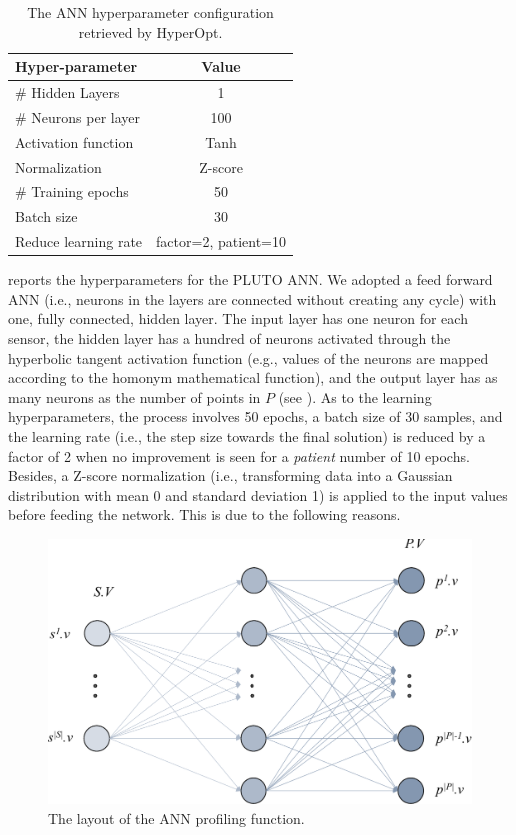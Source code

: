 \begin{table}[t]
\centering
\caption{The ANN hyperparameter configuration retrieved by HyperOpt.}
\begin{tabular}{lc}
\hline
Hyper-parameter & Value \\ \hline
\# Hidden Layers & 1 \\
\# Neurons per layer & 100 \\
Activation function & Tanh \\
Normalization & Z-score \\
\# Training epochs & 50 \\
Batch size & 30 \\
Reduce learning rate & factor=2, patient=10 \\ \hline
\end{tabular}
\label{tab:ann_configuration}
\end{table}

 reports the hyperparameters for the PLUTO ANN.
We adopted a feed forward ANN (i.e., neurons in the layers are connected without creating any cycle) with one, fully connected, hidden layer.
The input layer has one neuron for each sensor, the hidden layer has a hundred of neurons activated through the hyperbolic tangent activation function (e.g., values of the neurons are mapped according to the homonym mathematical function), and the output layer has as many neurons as the number of points in $P$ (see ).
As to the learning hyperparameters, the process involves 50 epochs, a batch size of 30 samples, and the learning rate (i.e., the step size towards the final solution) is reduced by a factor of 2 when no improvement is seen for a \textit{patient} number of 10 epochs.
Besides, a Z-score normalization (i.e., transforming data into a Gaussian distribution with mean 0 and standard deviation 1) is applied to the input values before feeding the network. This is due to the following reasons.
\begin{figure}[t]
\centering
\includegraphics[scale=.4]{chapters/physics-aware/pluto/img/ANN.pdf}
\caption{The layout of the ANN profiling function.}
\label{pluto-fig:ANN}
\end{figure}

